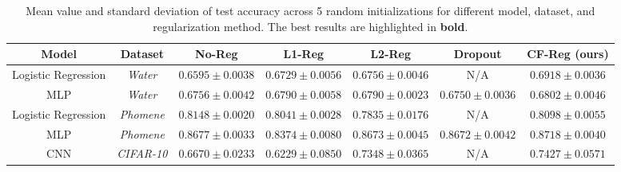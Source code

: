 \begin{table*}[h!]
    \centering
    \caption{Mean value and standard deviation of test accuracy across 5 random initializations for different model, dataset, and regularization method. The best results are highlighted in \textbf{bold}.}
    \label{tab:regularization_comparison}
    \begin{tabular}{|c|c|c|c|c|c|c|}
        \hline
        \textbf{Model} & \textbf{Dataset} & \textbf{No-Reg} & \textbf{L1-Reg} & \textbf{L2-Reg} & \textbf{Dropout} & \textbf{CF-Reg (ours)} \\ \hline
        Logistic Regression   & \textit{Water}   & $0.6595 \pm 0.0038$   & $0.6729 \pm 0.0056$   & $0.6756 \pm 0.0046$  & N/A    & $\mathbf{0.6918 \pm 0.0036}$                     \\ \hline
        MLP   & \textit{Water}   & $0.6756 \pm 0.0042$   & $0.6790 \pm 0.0058$   & $0.6790 \pm 0.0023$  & $0.6750 \pm 0.0036$    & $\mathbf{0.6802 \pm 0.0046}$                    \\ \hline
        Logistic Regression   & \textit{Phomene}   & $\mathbf{0.8148 \pm 0.0020}$   & $0.8041 \pm 0.0028$   & $0.7835 \pm 0.0176$  & N/A    & $0.8098 \pm 0.0055$                     \\ \hline
        MLP   & \textit{Phomene}   & $0.8677 \pm 0.0033$   & $0.8374 \pm 0.0080$   & $0.8673 \pm 0.0045$  & $0.8672 \pm 0.0042$     & $\mathbf{0.8718 \pm 0.0040}$                    \\ \hline
        CNN   & \textit{CIFAR-10} & $0.6670 \pm 0.0233$   & $0.6229 \pm 0.0850$   & $0.7348 \pm 0.0365$   & N/A    & $\mathbf{0.7427 \pm 0.0571}$                     \\ \hline
    \end{tabular}
\end{table*}

